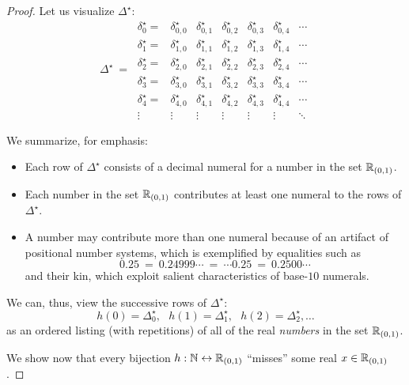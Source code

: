 \begin{proof}
\bigskip

\noindent Let us visualize $\Delta^\star$:
\[ \Delta^\star \ = \
\begin{array}{ccccccc}
\delta^\star_0 = &
\delta^\star_{0,0} & \delta^\star_{0,1} & \delta^\star_{0,2} & \delta^\star_{0,3} &
	\delta^\star_{0,4} & \cdots \\
\delta^\star_1 = &
\delta^\star_{1,0} & \delta^\star_{1,1} & \delta^\star_{1,2} & \delta^\star_{1,3} &
	\delta^\star_{1,4} & \cdots \\
\delta^\star_2 = &
\delta^\star_{2,0} & \delta^\star_{2,1} & \delta^\star_{2,2} & \delta^\star_{2,3} &
	\delta^\star_{2,4} & \cdots \\
\delta^\star_3 = &
\delta^\star_{3,0} & \delta^\star_{3,1} & \delta^\star_{3,2} & \delta^\star_{3,3} &
	\delta^\star_{3,4} & \cdots \\ 
\delta^\star_4 = &
\delta^\star_{4,0} & \delta^\star_{4,1} & \delta^\star_{4,2} & \delta^\star_{4,3} &
	\delta^\star_{4,4} & \cdots \\ 
\vdots &
\vdots  & \vdots  & \vdots  & \vdots  & \vdots  & \ddots
\end{array}
\]

\noindent We summarize, for emphasis:
\begin{itemize}
\item
Each row of $\Delta^\star$ consists of a decimal numeral for a number in the set $\mathbb{R}_{(0,1)}$.

\medskip\item
Each number in the set $\mathbb{R}_{(0,1)}$ contributes at least one numeral to the rows of $\Delta^\star$.

\medskip\item
A number may contribute more than one numeral because of an artifact of positional number systems, which is exemplified by equalities such as
\[
0.25 \ = \ 0.24999\cdots \ = \  \cdots 0.25 \ = \ 0.2500 \cdots
\]
and their kin, which exploit salient characteristics of base-$10$ numerals.
\end{itemize}
We can, thus, view the successive rows of $\Delta^\star$: 
\[ h(0) = \Delta^\star_0, \ \ \ h(1) = \Delta^\star_1,  \ \ \ h(2) = \Delta^\star_2, \ldots \]
as an ordered listing (with repetitions) of all of the real {\em numbers} in the set $\mathbb{R}_{(0,1)}$.

\medskip

We show now that every bijection $h: \mathbb{N} \leftrightarrow \mathbb{R}_{(0,1)}$ ``misses'' some real $x \in \mathbb{R}_{(0,1)}$.

\smallskip


\end{proof}
